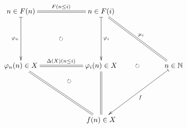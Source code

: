 \documentclass[12pt]{article}
\begin{document}
\pagestyle{empty}

\begin{align*}
  \vcenter{
    \xymatrix@=60pt{
      n \in F(n) \ar@{|->}[d]_{\varphi_n} \ar@{=}[r]^{F(n \leq i)} \ar@{{}{ }{}}[rd]|{\circlearrowright} &
      n \in F(i) \ar@{|->}[d]^{\varphi_i} \ar@{=}[rd]^{\mu_i} \\
      \varphi_n(n) \in X \ar@{=}[r]^{\Delta(X)(n \leq i)} \ar@{=}[rd] \ar@/^20pt/@{{}{ }{}}[rd]|{\circlearrowright} &
      \varphi_i(n) \in X \ar@{=}[d] \ar@{{}{ }{}}[r]|{\circlearrowright} &
      n \in \mathbb{N} \ar@{|->}[ld]^f \\
      & f(n) \in X
    }
  }
\end{align*}
\end{document}
